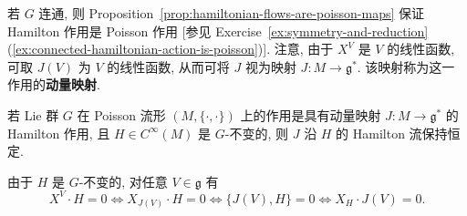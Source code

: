 若 $G$ 连通, 则 Proposition~\ref{prop:hamiltonian-flows-are-poisson-maps} 保证 Hamilton 作用是 Poisson 作用 [参见 Exercise~\ref{ex:symmetry-and-reduction}(\ref{ex:connected-hamiltonian-action-is-poisson})]. 注意, 由于 $X^V$ 是 $V$ 的线性函数, 可取 $J(V)$ 为 $V$ 的线性函数, 从而可将 $J$ 视为映射 $J:M\to\mathfrak{g}^*$. 该映射称为这一作用的\textbf{动量映射}.

\begin{RiemannTheorem}\label{thm:noether-for-hamiltonian-action}
若 Lie 群 $G$ 在 Poisson 流形 $(M,\{\cdot,\cdot\})$ 上的作用是具有动量映射 $J:M\to\mathfrak{g}^*$ 的 Hamilton 作用, 且 $H\in C^\infty(M)$ 是 $G$-不变的, 则 $J$ 沿 $H$ 的 Hamilton 流保持恒定.
\end{RiemannTheorem}

\begin{RiemannProof}
由于 $H$ 是 $G$-不变的, 对任意 $V\in\mathfrak{g}$ 有
\[
  X^V\cdot H=0\iff X_{J(V)}\cdot H=0\iff\{J(V),H\}=0\iff X_H\cdot J(V)=0.
\]
\end{RiemannProof}

